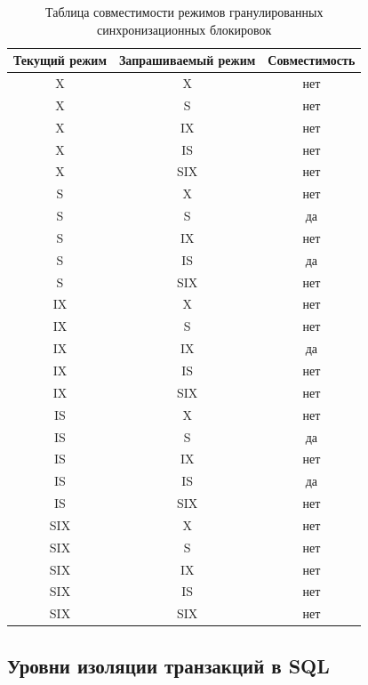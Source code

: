 \documentclass[a4paper,12pt]{article}
\begin{document}

\begin{table}[h!]
    \centering
    \begin{tabular}{|c|c|c|}
        \hline
        \textbf{Текущий режим} & \textbf{Запрашиваемый режим} & \textbf{Совместимость} \\
        \hline
        X & X & нет \\
        X & S & нет \\
        X & IX & нет \\
        X & IS & нет \\
        X & SIX & нет \\
        \hline
        S & X & нет \\
        S & S & да \\
        S & IX & нет \\
        S & IS & да \\
        S & SIX & нет \\
        \hline
        IX & X & нет \\
        IX & S & нет \\
        IX & IX & да \\
        IX & IS & нет \\
        IX & SIX & нет \\
        \hline
        IS & X & нет \\
        IS & S & да \\
        IS & IX & нет \\
        IS & IS & да \\
        IS & SIX & нет \\
        \hline
        SIX & X & нет \\
        SIX & S & нет \\
        SIX & IX & нет \\
        SIX & IS & нет \\
        SIX & SIX & нет \\
        \hline
    \end{tabular}
    \caption{Таблица совместимости режимов гранулированных синхронизационных блокировок}
\end{table}

\subsection{Уровни изоляции транзакций в SQL}
\end{document}
